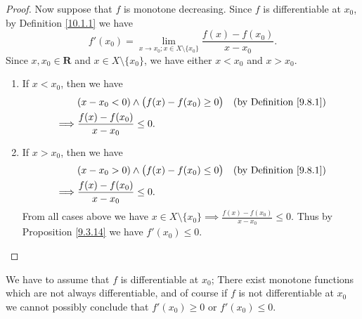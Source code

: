 \begin{proof}
    Now suppose that \(f\) is monotone decreasing.
    Since \(f\) is differentiable at \(x_0\), by Definition \ref{10.1.1} we have
    \[
        f'(x_0) = \lim_{x \to x_0 ; x \in X \setminus \{x_0\}} \frac{f(x) - f(x_0)}{x - x_0}.
    \]
    Since \(x, x_0 \in \mathbf{R}\) and \(x \in X \setminus \{x_0\}\), we have either \(x < x_0\) and \(x > x_0\).
    \begin{enumerate}
        \item If \(x < x_0\), then we have
              \begin{align*}
                           & (x - x_0 < 0) \land \big(f(x) - f(x_0) \geq 0\big) & \text{(by Definition \ref{9.8.1})} \\
                  \implies & \frac{f(x) - f(x_0)}{x - x_0} \leq 0.                                                   \\
              \end{align*}
        \item If \(x > x_0\), then we have
              \begin{align*}
                           & (x - x_0 > 0) \land \big(f(x) - f(x_0) \leq 0\big) & \text{(by Definition \ref{9.8.1})} \\
                  \implies & \frac{f(x) - f(x_0)}{x - x_0} \leq 0.                                                   \\
              \end{align*}
              From all cases above we have \(x \in X \setminus \{x_0\} \implies \frac{f(x) - f(x_0)}{x - x_0} \leq 0\).
              Thus by Proposition \ref{9.3.14} we have \(f'(x_0) \leq 0\).
    \end{enumerate}
\end{proof}

\begin{remark}\label{10.3.2}
    We have to assume that \(f\) is differentiable at \(x_0\);
    There exist monotone functions which are not always differentiable, and of course if \(f\) is not differentiable at \(x_0\) we cannot possibly conclude that \(f'(x_0) \geq 0\) or \(f'(x_0) \leq 0\).
\end{remark}